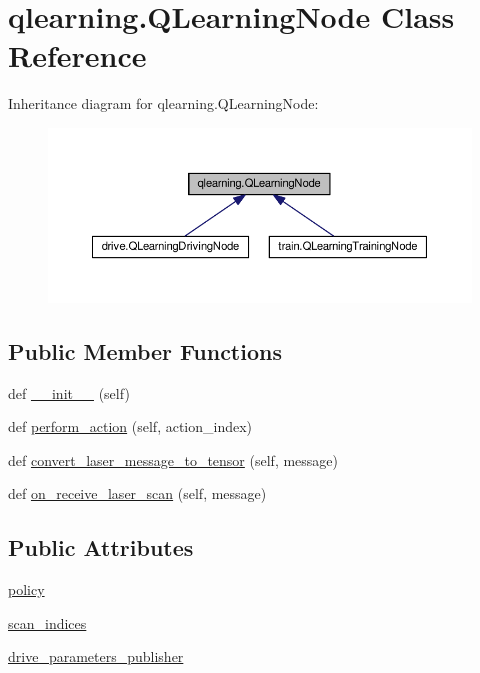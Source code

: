 \hypertarget{classqlearning_1_1_q_learning_node}{}\section{qlearning.\+Q\+Learning\+Node Class Reference}
\label{classqlearning_1_1_q_learning_node}


Inheritance diagram for qlearning.\+Q\+Learning\+Node\+:
\nopagebreak
\begin{figure}[H]
\begin{center}
\leavevmode
\includegraphics[width=350pt]{classqlearning_1_1_q_learning_node__inherit__graph}
\end{center}
\end{figure}
\subsection*{Public Member Functions}
\begin{DoxyCompactItemize}
\item 
def \hyperlink{classqlearning_1_1_q_learning_node_a6f95c46edee5acba7c59a3eac4e04a2a}{\+\_\+\+\_\+init\+\_\+\+\_\+} (self)
\item 
def \hyperlink{classqlearning_1_1_q_learning_node_a70f975497db6b5eee94485397b7c18e6}{perform\+\_\+action} (self, action\+\_\+index)
\item 
def \hyperlink{classqlearning_1_1_q_learning_node_a907441bbc5b795875ea80de4a6b45798}{convert\+\_\+laser\+\_\+message\+\_\+to\+\_\+tensor} (self, message)
\item 
def \hyperlink{classqlearning_1_1_q_learning_node_a2ac97685465b2c7d22ca26019cf2fff5}{on\+\_\+receive\+\_\+laser\+\_\+scan} (self, message)
\end{DoxyCompactItemize}
\subsection*{Public Attributes}
\begin{DoxyCompactItemize}
\item 
\hyperlink{classqlearning_1_1_q_learning_node_a2c1150dd506209b085dad03036775375}{policy}
\item 
\hyperlink{classqlearning_1_1_q_learning_node_a40b085aff23685cc49b297f287743ed6}{scan\+\_\+indices}
\item 
\hyperlink{classqlearning_1_1_q_learning_node_a2885dd3e3dbd44c0627829d35f9e0041}{drive\+\_\+parameters\+\_\+publisher}
\end{DoxyCompactItemize}


